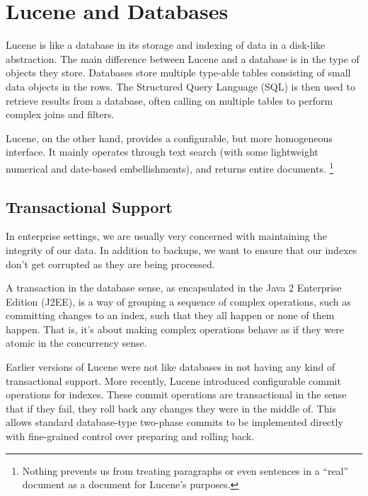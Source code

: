 \section{Lucene and Databases}

Lucene is like a database in its storage and indexing of data in a
disk-like abstraction.  The main difference between Lucene and a
database is in the type of objects they store.  Databases store
multiple type-able tables consisting of small data objects in the
rows.  The Structured Query Language (SQL) is then used to retrieve
results from a database, often calling on multiple tables to perform
complex joins and filters.  

Lucene, on the other hand, provides a configurable, but more
homogeneous interface.  It mainly operates through text search (with
some lightweight numerical and date-based embellishments), and
returns entire documents.%
%
\footnote{Nothing prevents us from treating paragraphs or even sentences in a
``real'' document as a document for Lucene's purposes.}

\subsection{Transactional Support}

In enterprise settings, we are usually very concerned with maintaining
the integrity of our data.  In addition to backups, we want to ensure
that our indexes don't get corrupted as they are being processed.

A transaction in the database sense, as encapsulated in the Java 2
Enterprise Edition (J2EE), is a way of grouping a sequence of complex
operations, such as committing changes to an index, such that they all
happen or none of them happen.  That is, it's about making complex
operations behave as if they were atomic in the concurrency sense.

Earlier versions of Lucene were not like databases in not having any
kind of transactional support.  More recently, Lucene introduced
configurable commit operations for indexes.  These commit operations
are transactional in the sense that if they fail, they roll back any
changes they were in the middle of.  This allows standard
database-type two-phase commits to be implemented directly with
fine-grained control over preparing and rolling back.

 







